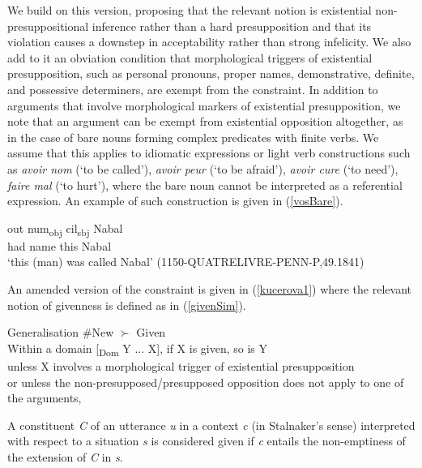 \documentclass[output=paper,modfonts,nonflat]{langsci/langscibook}
\begin{document}
We build on this version, proposing that the relevant notion is existential non-presuppositional inference rather than a hard presupposition and that its violation causes a downstep in acceptability rather than strong infelicity. We also add to it an obviation condition that morphological triggers of existential presupposition, such as personal pronouns, proper names, demonstrative, definite, and possessive determiners, are exempt from the constraint. In addition to arguments that involve morphological markers of existential presupposition, we note that an argument can be exempt from existential opposition altogether, as in the case of bare nouns forming complex predicates with finite verbs. We assume that this applies to idiomatic expressions or light verb constructions such as {\itshape avoir nom} (`to be called'), {\itshape avoir peur} (`to be afraid'), {\itshape avoir cure} (`to need'), {\itshape faire mal} (`to hurt'), where the bare noun cannot be interpreted as a referential expression. An example of such construction is given in (\ref{vosBare}).

\ea
\gll out num\textsubscript{obj} cil\textsubscript{sbj} Nabal\\
had name this Nabal\\
\glt `this (man) was called Nabal' \hfill (1150-QUATRELIVRE-PENN-P,49.1841) \label{vosBare}
\z

An amended version of the constraint is given in (\ref{kucerova1}) where the relevant notion of givenness is defined as in (\ref{givenSim}).

\ea \label{kucerova1}
Generalisation \#New $\succ$ Given\\
Within a domain [\textsubscript{Dom} Y ... X], if X is given, so is Y\\
unless X involves a morphological trigger of existential presupposition\\
or unless the non-presupposed/presupposed opposition does not apply to one of the arguments,\\
\z

\ea \label{givenSim}
A constituent {\itshape C} of an utterance {\itshape u} in a context {\itshape c} (in Stalnaker's sense) interpreted with respect to a situation {\itshape s} is considered given if {\itshape c} entails the non-emptiness of the extension of {\itshape C} in {\itshape s}.
\z
\end{document}
